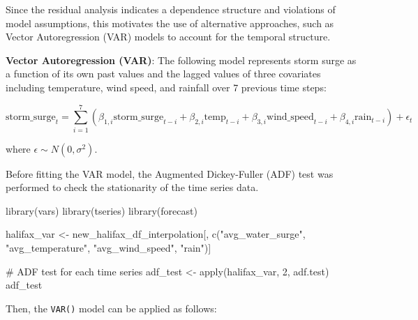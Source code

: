 \documentclass[
  letterpaper,
  DIV=11,
  numbers=noendperiod]{scrartcl}
\newenvironment{Shaded}{\begin{snugshade}}{\end{snugshade}}
\newcommand{\AttributeTok}[1]{\textcolor[rgb]{0.40,0.45,0.13}{#1}}
\newcommand{\CommentTok}[1]{\textcolor[rgb]{0.37,0.37,0.37}{#1}}
\newcommand{\DecValTok}[1]{\textcolor[rgb]{0.68,0.00,0.00}{#1}}
\newcommand{\FunctionTok}[1]{\textcolor[rgb]{0.28,0.35,0.67}{#1}}
\newcommand{\NormalTok}[1]{\textcolor[rgb]{0.00,0.23,0.31}{#1}}
\newcommand{\OtherTok}[1]{\textcolor[rgb]{0.00,0.23,0.31}{#1}}
\newcommand{\SpecialCharTok}[1]{\textcolor[rgb]{0.37,0.37,0.37}{#1}}
\newcommand{\StringTok}[1]{\textcolor[rgb]{0.13,0.47,0.30}{#1}}
\begin{document}
Since the residual analysis indicates a dependence structure and
violations of model assumptions, this motivates the use of alternative
approaches, such as Vector Autoregression (VAR) models to account for
the temporal structure.

\textbf{Vector Autoregression (VAR)}: The following model represents
storm surge as a function of its own past values and the lagged values
of three covariates including temperature, wind speed, and rainfall over
7 previous time steps:

\[
\text{storm\_surge}_t=\sum_{i=1}^7(\beta_{1, i}\text{storm\_surge}_{t-i}+\beta_{2, i}\text{temp}_{t-i}+\beta_{3, i}\text{wind\_speed}_{t-i}+\beta_{4, i}\text{rain}_{t-i})+\epsilon_t
\]

where \(\epsilon\sim N(0, \sigma^2)\).

Before fitting the VAR model, the Augmented Dickey-Fuller (ADF) test was
performed to check the stationarity of the time series data.

\begin{Shaded}
\begin{Highlighting}[]
\FunctionTok{library}\NormalTok{(vars)}
\FunctionTok{library}\NormalTok{(tseries)}
\FunctionTok{library}\NormalTok{(forecast)}

\NormalTok{halifax\_var }\OtherTok{\textless{}{-}}\NormalTok{ new\_halifax\_df\_interpolation[, }\FunctionTok{c}\NormalTok{(}\StringTok{"avg\_water\_surge"}\NormalTok{, }\StringTok{"avg\_temperature"}\NormalTok{,}
    \StringTok{"avg\_wind\_speed"}\NormalTok{, }\StringTok{"rain"}\NormalTok{)]}

\CommentTok{\# ADF test for each time series}
\NormalTok{adf\_test }\OtherTok{\textless{}{-}} \FunctionTok{apply}\NormalTok{(halifax\_var, }\DecValTok{2}\NormalTok{, adf.test)}
\NormalTok{adf\_test}
\end{Highlighting}
\end{Shaded}

Then, the \texttt{VAR()} model can be applied as follows:

\begin{Shaded}
\end{Shaded}
\end{document}
